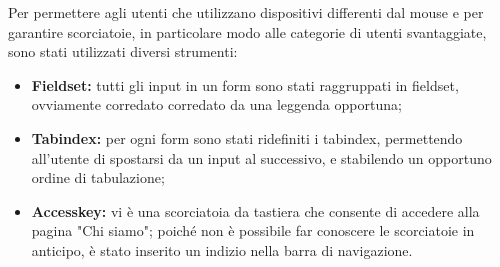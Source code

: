 Per permettere agli utenti che utilizzano dispositivi differenti dal mouse e per garantire scorciatoie, in particolare modo alle categorie di utenti svantaggiate, sono stati utilizzati diversi strumenti:
\begin{itemize}
	\item \textbf{Fieldset: }tutti gli input in un form sono stati raggruppati in fieldset, ovviamente corredato corredato da una leggenda opportuna;
	\item \textbf{Tabindex: }per ogni form sono stati ridefiniti i tabindex, permettendo all'utente di spostarsi da un input al successivo, e stabilendo un opportuno ordine di tabulazione;
	\item \textbf{Accesskey: }vi è una scorciatoia da tastiera che consente di accedere alla pagina "Chi siamo"; poiché non è possibile far conoscere le scorciatoie in anticipo, è stato inserito un indizio nella barra di navigazione.
\end{itemize}